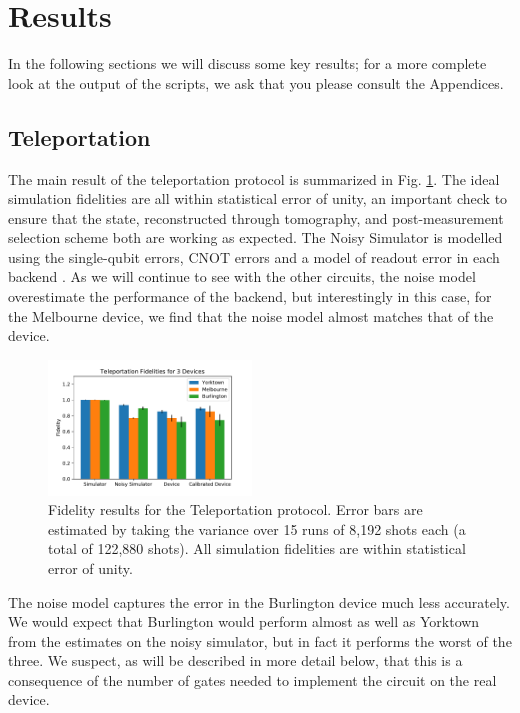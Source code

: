 \section{Results} In the following sections we will discuss some key results;
for a more complete look at the output of the scripts, we ask that you please
consult the Appendices.

\subsection{Teleportation} The main result of the teleportation protocol is
summarized in Fig. \ref{fig:teleport_histogram}. The ideal simulation fidelities
are all within statistical error of unity, an important check to ensure that the
state, reconstructed through tomography, and post-measurement selection scheme
both are working as expected. The Noisy Simulator is modelled using the
single-qubit errors, CNOT errors and a model of readout error in each backend
\cite{qiskit_org}. As we will continue to see with the other circuits, the noise
model overestimate the performance of the backend, but interestingly in this
case, for the Melbourne device, we find that the noise model almost matches that
of the device.

\begin{figure}[h] \centering
	\includegraphics[width=0.48\textwidth]{images/results/teleport_histogram.pdf}
	\caption{Fidelity results for the Teleportation protocol. Error bars are
		estimated by taking the variance over 15 runs of 8,192 shots each (a total of
		122,880 shots). All simulation fidelities are within statistical error of
		unity.}
	\label{fig:teleport_histogram}
\end{figure}

The noise model captures the error in the Burlington device much less
accurately. We would expect that Burlington would perform almost as well as
Yorktown from the estimates on the noisy simulator, but in fact it performs the
worst of the three. We suspect, as will be described in more detail below, that
this is a consequence of the number of gates needed to implement the circuit on
the real device.

